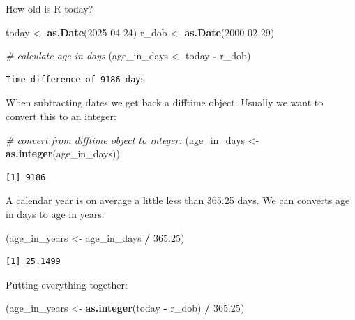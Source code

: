 \documentclass[
]{book}
\newenvironment{Shaded}{\begin{snugshade}}{\end{snugshade}}
\newcommand{\CommentTok}[1]{\textcolor[rgb]{0.56,0.35,0.01}{\textit{#1}}}
\newcommand{\FloatTok}[1]{\textcolor[rgb]{0.00,0.00,0.81}{#1}}
\newcommand{\FunctionTok}[1]{\textcolor[rgb]{0.13,0.29,0.53}{\textbf{#1}}}
\newcommand{\NormalTok}[1]{#1}
\newcommand{\OtherTok}[1]{\textcolor[rgb]{0.56,0.35,0.01}{#1}}
\newcommand{\SpecialCharTok}[1]{\textcolor[rgb]{0.81,0.36,0.00}{\textbf{#1}}}
\newcommand{\StringTok}[1]{\textcolor[rgb]{0.31,0.60,0.02}{#1}}
\begin{document}
How old is R today?

\begin{Shaded}
\begin{Highlighting}[]
\NormalTok{today }\OtherTok{\textless{}{-}} \FunctionTok{as.Date}\NormalTok{(}\StringTok{\textquotesingle{}2025{-}04{-}24\textquotesingle{}}\NormalTok{)}
\NormalTok{r\_dob }\OtherTok{\textless{}{-}} \FunctionTok{as.Date}\NormalTok{(}\StringTok{\textquotesingle{}2000{-}02{-}29\textquotesingle{}}\NormalTok{)}

\CommentTok{\# calculate age in days}
\NormalTok{(age\_in\_days }\OtherTok{\textless{}{-}}\NormalTok{ today }\SpecialCharTok{{-}}\NormalTok{ r\_dob)}
\end{Highlighting}
\end{Shaded}

\begin{verbatim}
Time difference of 9186 days
\end{verbatim}

When subtracting dates we get back a difftime object. Usually we want to convert this to an integer:

\begin{Shaded}
\begin{Highlighting}[]
\CommentTok{\# convert from difftime object to integer:}
\NormalTok{(age\_in\_days }\OtherTok{\textless{}{-}} \FunctionTok{as.integer}\NormalTok{(age\_in\_days))}
\end{Highlighting}
\end{Shaded}

\begin{verbatim}
[1] 9186
\end{verbatim}

A calendar year is on average a little less than 365.25 days. We can converts age in days to age in years:

\begin{Shaded}
\begin{Highlighting}[]
\NormalTok{(age\_in\_years }\OtherTok{\textless{}{-}}\NormalTok{ age\_in\_days }\SpecialCharTok{/} \FloatTok{365.25}\NormalTok{)}
\end{Highlighting}
\end{Shaded}

\begin{verbatim}
[1] 25.1499
\end{verbatim}

Putting everything together:

\begin{Shaded}
\begin{Highlighting}[]
\NormalTok{(age\_in\_years }\OtherTok{\textless{}{-}} \FunctionTok{as.integer}\NormalTok{(today }\SpecialCharTok{{-}}\NormalTok{ r\_dob) }\SpecialCharTok{/} \FloatTok{365.25}\NormalTok{)}
\end{Highlighting}
\end{Shaded}
\end{document}
